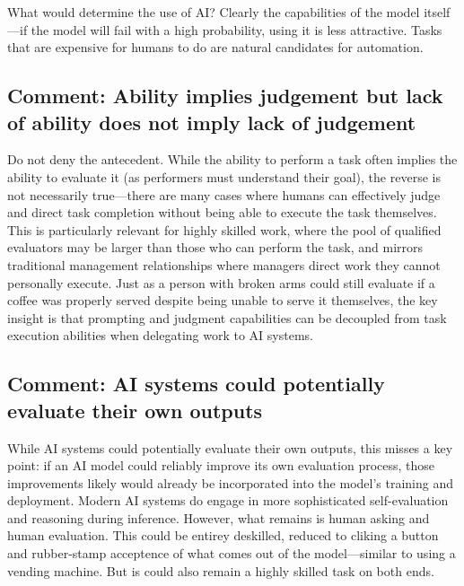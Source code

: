 \documentclass{article}
\begin{document}
What would determine the use of AI? 
Clearly the capabilities of the model itself---if the model will fail with a high probability, using it is less attractive.
Tasks that are expensive for humans to do are natural candidates for automation.




\begin{tcolorbox}
\subsection{Comment: Ability implies judgement but lack of ability does not imply lack of judgement}
Do not deny the antecedent.
While the ability to perform a task often implies the ability to evaluate it (as performers must understand their goal), the reverse is not necessarily true---there are many cases where humans can effectively judge and direct task completion without being able to execute the task themselves. 
This is particularly relevant for highly skilled work, where the pool of qualified evaluators may be larger than those who can perform the task, and mirrors traditional management relationships where managers direct work they cannot personally execute. 
Just as a person with broken arms could still evaluate if a coffee was properly served despite being unable to serve it themselves, the key insight is that prompting and judgment capabilities can be decoupled from task execution abilities when delegating work to AI systems.
\end{tcolorbox}


\begin{tcolorbox}
\subsection{Comment: AI systems could potentially evaluate their own outputs}
While AI systems could potentially evaluate their own outputs, this misses a key point: if an AI model could reliably improve its own evaluation process, those improvements likely would already be incorporated into the model's training and deployment.
Modern AI systems do engage in more sophisticated self-evaluation and reasoning during inference. 
However, what remains is human asking and human evaluation.
This could be entirey deskilled, reduced to cliking a button and rubber-stamp acceptence of what comes out of the model---similar to using a vending machine.
But is could also remain a highly skilled task on both ends.
\end{tcolorbox}
\end{document}
